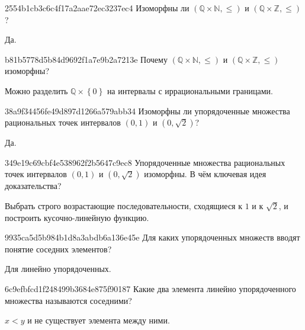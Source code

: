 \begin{note}{2554b1cb3c6c4f17a2aae72ec3237ec4}
    Изоморфны ли \({ (\mathbb Q \times \mathbb N, \leqslant) }\) и \({ (\mathbb Q \times \mathbb Z, \leqslant) }\)?

    \begin{cloze}{1}
        Да.
    \end{cloze}
\end{note}

\begin{note}{b81b5778d5b84d9692f1a7e9b2a7213e}
    Почему \({ (\mathbb Q \times \mathbb N, \leqslant) }\) и \({ (\mathbb Q \times \mathbb Z, \leqslant) }\) изоморфны?

    \begin{cloze}{1}
        Можно разделить \({ \mathbb Q \times \left\{ 0 \right\} }\) на интервалы с иррациональными границами.
    \end{cloze}
\end{note}

\begin{note}{38a9f34456fe49d897d1266a579abb34}
    Изоморфны ли упорядоченные множества рациональных точек интервалов \({ (0, 1) }\) и \({ (0, \sqrt{2}) }\)?

    \begin{cloze}{1}
        Да.
    \end{cloze}
\end{note}

\begin{note}{349e19c69cbf4e538962f2b5647c9ec8}
    Упорядоченные множества рациональных точек интервалов \({ (0, 1) }\) и \({ (0, \sqrt{2}) }\) изоморфны.
    В чём ключевая идея доказательства?

    \begin{cloze}{1}
        Выбрать строго возрастающие последовательности, сходящиеся к \({ 1 }\) и к \({ \sqrt{2} }\), и построить кусочно-линейную функцию.
    \end{cloze}
\end{note}

\begin{note}{9935ca5d5b984b1d8a3abdb6a136e45e}
    Для каких упорядоченных множеств вводят понятие соседних элементов?

    \begin{cloze}{1}
        Для линейно упорядоченных.
    \end{cloze}
\end{note}

\begin{note}{6c9efbfcd1f248499b3684e875f90187}
    Какие два элемента линейно упорядоченного множества называются соседними?

    \begin{cloze}{1}
        \({ x < y }\) и не существует элемента между ними.
    \end{cloze}
\end{note}

